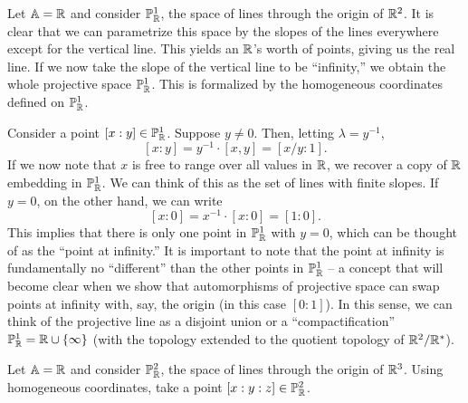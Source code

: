 \documentclass{../../mathnotes}
\begin{document}
\begin{exmp}
    Let $\mathbb{A}=\mathbb{R}$ and consider $\mathbb{P}^1_{\mathbb{R}}$, the space of lines through the origin of $\mathbb{R}^2$. It is clear that we can
    parametrize this space by the slopes of the lines everywhere except for the vertical line. This yields an $\mathbb{R}$'s worth
    of points, giving us the real line. If we now take the slope of the vertical line to be ``infinity,'' we obtain
    the whole projective space $\mathbb{P}^1_{\mathbb{R}}$. This is formalized by the homogeneous coordinates defined on $\mathbb{P}^1_{\mathbb{R}}$.

    Consider a point $[x:y]\in\mathbb{P}^1_{\mathbb{R}}$. Suppose $y\neq0$. Then, letting $\lambda=y^{-1}$,
    \[ [x:y]=y^{-1}\cdot[x,y]=[x/y:1]. \]
    If we now note that $x$ is free to range over all values in $\mathbb{R}$, we recover a copy of $\mathbb{R}$ embedding in $\mathbb{P}_{\mathbb{R}}^1$.
    We can think of this as the set of lines with finite slopes. If $y=0$, on the other hand, we can write
    \[ [x:0]=x^{-1}\cdot [x:0]=[1:0]. \]
    This implies that there is only one point in $\mathbb{P}^1_{\mathbb{R}}$ with $y=0$, which can be thought of as the ``point
    at infinity.'' It is important to note that the point at infinity is fundamentally no ``different'' than the other points
    in $\mathbb{P}_{\mathbb{R}}^1$ -- a concept that will become clear when we show that automorphisms of projective space can swap points
    at infinity with, say, the origin (in this case $[0:1]$). In this sense, we can think of the projective line as a disjoint union 
    or a ``compactification''
    $\mathbb{P}^1_{\mathbb{R}}=\mathbb{R}\cup\{\infty\}$
    (with the topology extended to the quotient topology of $\mathbb{R}^2/\mathbb{R}^*$).
\end{exmp}

\begin{exmp}
    Let $\mathbb{A}=\mathbb{R}$ and consider $\mathbb{P}^2_{\mathbb{R}}$, the space of lines through the origin of $\mathbb{R}^3$. Using homogeneous coordinates,
    take a point $[x:y:z]\in\mathbb{P}^2_{\mathbb{R}}$.
\end{exmp}
\end{document}
